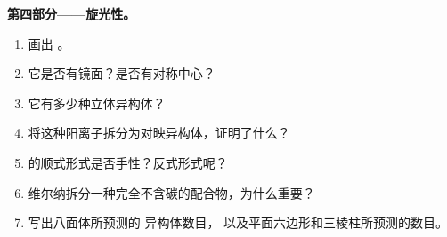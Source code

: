 \begin{problem}
\medskip
\noindent\textbf{第四部分——旋光性。}
\begin{enumerate}[resume]
  \item 画出 。
  \item 它是否有镜面？是否有对称中心？
  \item 它有多少种立体异构体？
  \item 将这种阳离子拆分为对映异构体，证明了什么？
  \item \ce{[CoCl2(en)2]+} 的顺式形式是否手性？反式形式呢？
  \item 维尔纳拆分一种完全不含碳的配合物，为什么重要？
  \item 写出八面体所预测的 \ce{[CoCl2(NH3)4]+} 异构体数目，
        以及平面六边形和三棱柱所预测的数目。
\end{enumerate}
\end{problem}
